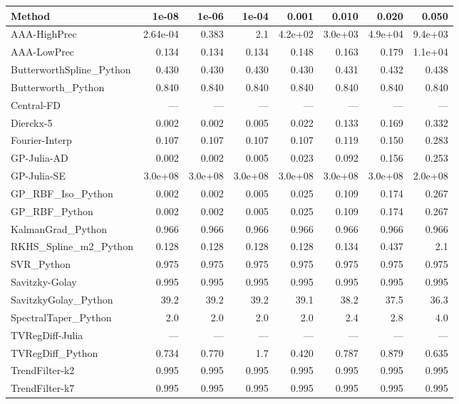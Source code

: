 \begin{longtable}{lrrrrrrr}
\toprule
\textbf{Method} & \textbf{1e-08} & \textbf{1e-06} & \textbf{1e-04} & \textbf{0.001} & \textbf{0.010} & \textbf{0.020} & \textbf{0.050} \\
\midrule
\endhead
AAA-HighPrec & 2.64e-04 & 0.383 & 2.1 & 4.2e+02 & 3.0e+03 & 4.9e+04 & 9.4e+03 \\
AAA-LowPrec & 0.134 & 0.134 & 0.134 & 0.148 & 0.163 & 0.179 & 1.1e+04 \\
ButterworthSpline\_Python & 0.430 & 0.430 & 0.430 & 0.430 & 0.431 & 0.432 & 0.438 \\
Butterworth\_Python & 0.840 & 0.840 & 0.840 & 0.840 & 0.840 & 0.840 & 0.840 \\
Central-FD & --- & --- & --- & --- & --- & --- & --- \\
Dierckx-5 & 0.002 & 0.002 & 0.005 & 0.022 & 0.133 & 0.169 & 0.332 \\
Fourier-Interp & 0.107 & 0.107 & 0.107 & 0.107 & 0.119 & 0.150 & 0.283 \\
GP-Julia-AD & 0.002 & 0.002 & 0.005 & 0.023 & 0.092 & 0.156 & 0.253 \\
GP-Julia-SE & 3.0e+08 & 3.0e+08 & 3.0e+08 & 3.0e+08 & 3.0e+08 & 3.0e+08 & 2.0e+08 \\
GP\_RBF\_Iso\_Python & 0.002 & 0.002 & 0.005 & 0.025 & 0.109 & 0.174 & 0.267 \\
GP\_RBF\_Python & 0.002 & 0.002 & 0.005 & 0.025 & 0.109 & 0.174 & 0.267 \\
KalmanGrad\_Python & 0.966 & 0.966 & 0.966 & 0.966 & 0.966 & 0.966 & 0.966 \\
RKHS\_Spline\_m2\_Python & 0.128 & 0.128 & 0.128 & 0.128 & 0.134 & 0.437 & 2.1 \\
SVR\_Python & 0.975 & 0.975 & 0.975 & 0.975 & 0.975 & 0.975 & 0.975 \\
Savitzky-Golay & 0.995 & 0.995 & 0.995 & 0.995 & 0.995 & 0.995 & 0.995 \\
SavitzkyGolay\_Python & 39.2 & 39.2 & 39.2 & 39.1 & 38.2 & 37.5 & 36.3 \\
SpectralTaper\_Python & 2.0 & 2.0 & 2.0 & 2.0 & 2.4 & 2.8 & 4.0 \\
TVRegDiff-Julia & --- & --- & --- & --- & --- & --- & --- \\
TVRegDiff\_Python & 0.734 & 0.770 & 1.7 & 0.420 & 0.787 & 0.879 & 0.635 \\
TrendFilter-k2 & 0.995 & 0.995 & 0.995 & 0.995 & 0.995 & 0.995 & 0.995 \\
TrendFilter-k7 & 0.995 & 0.995 & 0.995 & 0.995 & 0.995 & 0.995 & 0.995 \\

\end{longtable}
